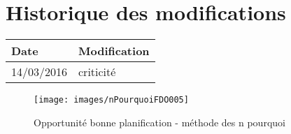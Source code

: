 \section*{Historique des modifications}
\begin{table}[h]
\centering
	\begin{tabularx}{16.8cm}{|X|X|}
	\hline
	\rowcolor{gray!40} Date & Modification \\%
	\hline
	 14/03/2016 & criticité\\
	\hline
	\end{tabularx}
\end{table}
\newpage


\begin{figure}
	\centering
	\texttt{[image: images/nPourquoiFDO005]}
	\caption{\label{opportunite bonne planification}Opportunité bonne planification - méthode des n pourquoi}
\end{figure}
